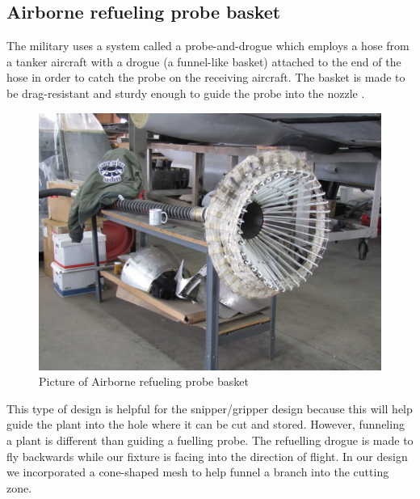 \documentclass{wrcecapstone}
\begin{document}
\subsection{Airborne refueling probe basket}
The military uses a system called a probe-and-drogue which employs a hose from a tanker aircraft with a drogue (a funnel-like basket) attached to the end of the hose in order to catch the probe on the receiving aircraft.  The basket is made to be drag-resistant and sturdy enough to guide the probe into the nozzle \cite{ren2019reliable}.    
\begin{figure}
\begin{center}
\includegraphics[width=0.8\columnwidth]{figures/fig33-refueling.png}
\end{center}
\caption{Picture of Airborne refueling probe basket \cite{ren2019reliable}}
\label{fig:3.3}
\end{figure}

This type of design is helpful for the snipper/gripper design because this will help guide the plant into the hole where it can be cut and stored.  However, funneling a plant is different than guiding a fuelling probe.  The refuelling drogue is made to fly backwards while our fixture is facing into the direction of flight.  In our design we incorporated a cone-shaped mesh to help funnel a branch into the cutting zone.
\end{document}
